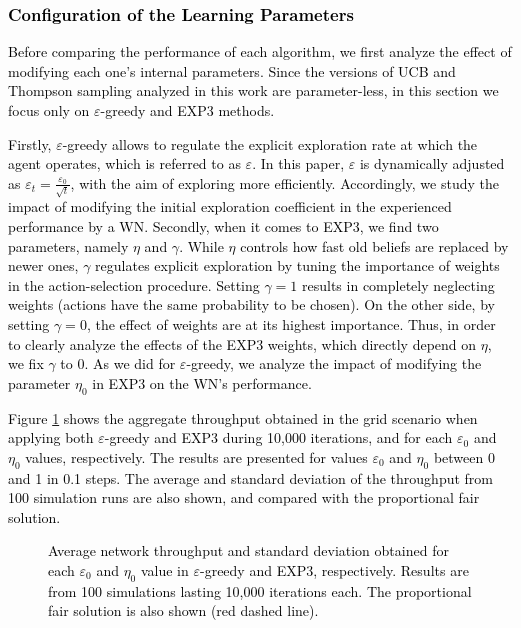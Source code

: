 \documentclass{article}
\begin{document}
	\textcolor{black}{\subsubsection{Configuration of the Learning Parameters}}
	
	\textcolor{black}{Before comparing the performance of each algorithm, we first analyze the effect of modifying each one's internal parameters. Since the versions of UCB and Thompson sampling analyzed in this work are parameter-less, in this section we focus only on $\varepsilon$-greedy and EXP3 methods.}
	
	\textcolor{black}{Firstly, $\varepsilon$-greedy allows to regulate the explicit exploration rate at which the agent operates, which is referred to as $\varepsilon$. In this paper, $\varepsilon$ is dynamically adjusted as $\varepsilon_t = \frac{\varepsilon_0}{\sqrt{t}}$, with the aim of exploring more efficiently. Accordingly, we study the impact of modifying the initial exploration coefficient in the experienced performance by a WN. Secondly, when it comes to EXP3, we find two parameters, namely $\eta$ and $\gamma$. While $\eta$ controls how fast old beliefs are replaced by newer ones, $\gamma$ regulates explicit exploration by tuning the importance of weights in the action-selection procedure. Setting $\gamma = 1$ results in completely neglecting weights (actions have the same probability to be chosen). On the other side, by setting $\gamma = 0$, the effect of weights are at its highest importance. Thus, in order to clearly analyze the effects of the EXP3 weights, which directly depend on $\eta$, we fix $\gamma$ to 0. As we did for $\varepsilon$-greedy, we analyze the impact of modifying the parameter $\eta_0$ in EXP3 on the WN's performance.}
	
	\textcolor{black}{Figure \ref{fig:tuning_parameters} shows the aggregate throughput obtained in the grid scenario when applying both $\varepsilon$-greedy and EXP3 during 10,000 iterations, and for each $\varepsilon_0$ and $\eta_0$ values, respectively. The results are presented for values $\varepsilon_0$ and $\eta_0$ between 0 and 1 in 0.1 steps. The average and standard deviation of the throughput from 100 simulation runs are also shown, and compared with the proportional fair solution.}
	
	\begin{figure}[h!]
		\centering
		\label{fig:tuning_parameters}
		\caption{\textcolor{black}{Average network throughput and standard deviation obtained for each $\varepsilon_0$ and $\eta_0$ value in $\varepsilon$-greedy and EXP3, respectively. Results are from 100 simulations lasting 10,000 iterations each. The proportional fair solution is also shown (red dashed line).}}
		\label{fig:tuning_parameters}
	\end{figure}
	
\end{document}
